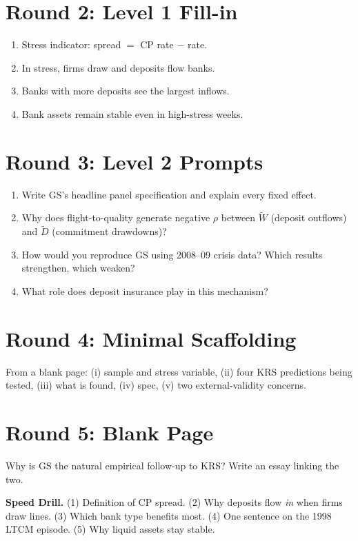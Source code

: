 \documentclass[11pt]{article}
\newcommand{\blank}[1]{\underline{\hspace{#1}}}
\begin{document}
\section*{Round 2: Level 1 Fill-in}
\begin{enumerate}
\item Stress indicator: \blank{2cm} spread $=$ CP rate $-$ \blank{1cm} rate.
\item In stress, firms draw \blank{2cm} and deposits flow \blank{1cm} banks.
\item Banks with more \blank{2cm} deposits see the largest inflows.
\item Bank \blank{2cm} assets remain stable even in high-stress weeks.
\end{enumerate}

\section*{Round 3: Level 2 Prompts}
\begin{enumerate}
\item Write GS's headline panel specification and explain every fixed effect.
\item Why does flight-to-quality generate negative $\rho$ between $\tilde W$ (deposit outflows) and $\tilde D$ (commitment drawdowns)?
\item How would you reproduce GS using 2008--09 crisis data? Which results strengthen, which weaken?
\item What role does deposit insurance play in this mechanism?
\end{enumerate}

\section*{Round 4: Minimal Scaffolding}
From a blank page: (i) sample and stress variable, (ii) four KRS predictions being tested, (iii) what is found, (iv) spec, (v) two external-validity concerns.

\section*{Round 5: Blank Page}
Why is GS the natural empirical follow-up to KRS? Write an essay linking the two.

\vspace{6pt}
\begin{drillbox}
\textbf{Speed Drill.} (1) Definition of CP spread. (2) Why deposits flow \emph{in} when firms draw lines. (3) Which bank type benefits most. (4) One sentence on the 1998 LTCM episode. (5) Why liquid assets stay stable.
\end{drillbox}
\end{document}

